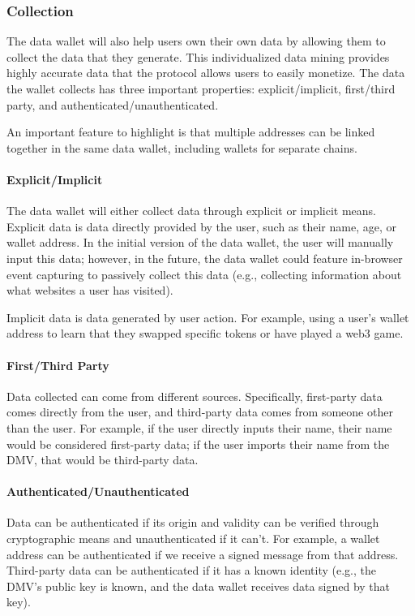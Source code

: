 \subsubsection{Collection}
The data wallet will also help users own their own data by allowing them to collect the data that they generate. This individualized data mining provides highly accurate data that the protocol allows users to easily monetize. The data the wallet collects has three important properties: explicit/implicit, first/third party, and authenticated/unauthenticated. %

An important feature to highlight is that multiple addresses can be linked together in the same data wallet, including wallets for separate chains. %

\paragraph{Explicit/Implicit}
The data wallet will either collect data through explicit or implicit means. Explicit data is data directly provided by the user, such as their name, age, or wallet address. In the initial version of the data wallet, the user will manually input this data; however, in the future, the data wallet could feature in-browser event capturing to passively collect this data (e.g., collecting information about what websites a user has visited).


Implicit data is data generated by user action. For example, using a user's wallet address to learn that they swapped specific tokens or have played a web3 game. 


\paragraph{First/Third Party}
Data collected can come from different sources. Specifically, first-party data comes directly from the user, and third-party data comes from someone other than the user. For example, if the user directly inputs their name, their name would be considered first-party data; if the user imports their name from the DMV, that would be third-party data.


\paragraph{Authenticated/Unauthenticated}
Data can be authenticated if its origin and validity can be verified through cryptographic means and unauthenticated if it can't. For example, a wallet address can be authenticated if we receive a signed message from that address. Third-party data can be authenticated if it has a known identity (e.g., the DMV's public key is known, and the data wallet receives data signed by that key). 

